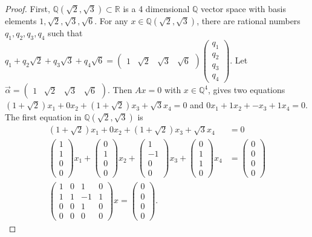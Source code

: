 \documentclass{article}
\newcommand{\Q}[0]{\mathbb{Q}}		%
\newcommand{\R}[0]{\mathbb{R}}		%
\theoremstyle{definition}
\theoremstyle{remark}
\begin{document}
\begin{proof}
First, $\Q(\sqrt{2},\sqrt{3})\subset \R$ is a  4 dimensional $\Q$ vector space with basis elements $1,\sqrt{2},\sqrt{3},\sqrt{6}$. For any $x\in \Q(\sqrt{2},\sqrt{3})$, there are rational numbers $q_1,q_2,q_3,q_4$ such that $q_1+q_2\sqrt{2} +q_3\sqrt{3} +q_4\sqrt{6} = \begin{pmatrix}1& \sqrt{2} & \sqrt{3} & \sqrt{6} \end{pmatrix}\begin{pmatrix} q_1\\ q_2\\q_3\\q_4\end{pmatrix}$.  Let $\vec{\alpha} = \begin{pmatrix}1& \sqrt{2} & \sqrt{3} & \sqrt{6} \end{pmatrix}$. Then $Ax = 0$ with $x\in \Q^4$, gives two equations $(1+\sqrt{2}) x_1 + 0 x_2 + (1+\sqrt{2}) x_3 + \sqrt{3}x_4 = 0$ and  $0x_1 + 1 x_2 + - x_3 + 1x_4 = 0$. The first equation in $\Q(\sqrt{2},\sqrt{3})$ is \begin{align}
    (1+\sqrt{2}) x_1 + 0 x_2 + (1+\sqrt{2}) x_3 + \sqrt{3}x_4 &= 0\\ 
     \begin{pmatrix}1\\1\\0\\0\end{pmatrix} x_1 +\begin{pmatrix}0\\1\\0\\0\end{pmatrix} x_2+  \begin{pmatrix}1\\-1\\0\\0\end{pmatrix} x_3+  \begin{pmatrix}0\\1\\1\\0\end{pmatrix} x_4& =\begin{pmatrix}0\\0\\0\\0\end{pmatrix} \\ 
    \begin{pmatrix}1&0&1&0\\1&1&-1&1\\0&0&1&0\\0&0&0&0\end{pmatrix} x =\begin{pmatrix}0\\0\\0\\0\end{pmatrix} . 

\end{align}
\end{proof}
\end{document}
